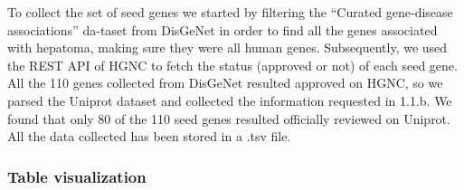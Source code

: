 \documentclass[
]{article}
\begin{document}
To collect the set of seed genes we started by filtering the ``Curated
gene-disease associations'' da-taset from DisGeNet in order to find all
the genes associated with hepatoma, making sure they were all human
genes. Subsequently, we used the REST API of HGNC to fetch the status
(approved or not) of each seed gene. All the 110 genes collected from
DisGeNet resulted approved on HGNC, so we parsed the Uniprot dataset and
collected the information requested in 1.1.b. We found that only 80 of
the 110 seed genes resulted officially reviewed on Uniprot. All the data
collected has been stored in a .tsv file.

\hypertarget{table-visualization}{%
\subsubsection{Table visualization}\label{table-visualization}}
\end{document}
